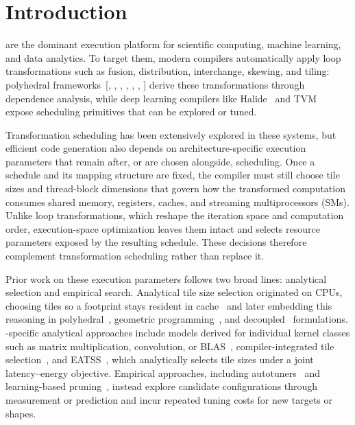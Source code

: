 \section{Introduction}
\label{sec:intro}

\gpus are the dominant execution platform for scientific computing, machine learning, and data analytics. To target them, modern compilers automatically apply loop transformations such as fusion, distribution, interchange, skewing, and tiling: polyhedral frameworks~{\hypersetup{citecolor=black}[, , , , , , ]} derive these transformations through dependence analysis, while deep learning compilers like Halide~\cite{halide} and TVM~\cite{tvm} expose scheduling primitives that can be explored or tuned.

Transformation scheduling has been extensively explored in these systems, but efficient \gpu code generation also depends on architecture-specific execution parameters that remain after, or are chosen alongside, scheduling. Once a schedule and its mapping structure are fixed, the compiler must still choose tile sizes and thread-block dimensions that govern how the transformed computation consumes shared memory, registers, caches, and streaming multiprocessors (SMs). Unlike loop transformations, which reshape the iteration space and computation order, execution-space optimization leaves them intact and selects resource parameters exposed by the resulting schedule. These decisions therefore complement transformation scheduling rather than replace it.

Prior work on these execution parameters follows two broad lines: analytical selection and empirical search. Analytical tile size selection originated on CPUs, choosing tiles so a footprint stays resident in cache~\cite{mckinley-tss,lam-tss} and later embedding this reasoning in polyhedral~\cite{pluto-tss}, geometric programming~\cite{rajopadhye-gp,rajopadhye-igp}, and decoupled~\cite{tilemind} formulations. \gpu-specific analytical approaches include models derived for individual kernel classes such as matrix multiplication, convolution, or BLAS~\cite{li-gemm,saday-conv,blis}, compiler-integrated tile selection~\cite{ppcg-tss}, and EATSS~\cite{eatss}, which analytically selects \gpu tile sizes under a joint latency--energy objective. Empirical approaches, including autotuners~\cite{metaschedule,ansor,automatichalide} and learning-based pruning~\cite{hctuner,shirako-tss,yuki-tss}, instead explore candidate configurations through measurement or prediction and incur repeated tuning costs for new targets or shapes.

